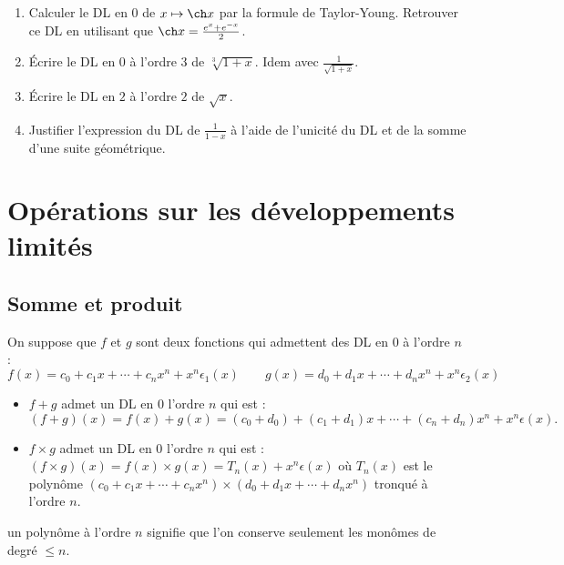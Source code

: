 \documentclass[class=report,crop=false]{standalone}
\begin{document}
\begin{miniexercices}
\sauteligne
\begin{enumerate}
  \item Calculer le DL en $0$ de $x\mapsto \ch x$ par la formule de Taylor-Young.
Retrouver ce DL en utilisant que $\ch x = \frac{e^x+e^{-x}}{2}$.
  \item Écrire le DL en $0$ à l'ordre $3$ de $\sqrt[3]{1+x}$. Idem avec $\frac{1}{\sqrt{1+x}}$.
  \item Écrire le DL en $2$ à l'ordre $2$ de $\sqrt{x}$.
  \item Justifier l'expression du DL de $\frac{1}{1-x}$ à l'aide de l'unicité du DL
et de la somme d'une suite géométrique.
\end{enumerate}
\end{miniexercices}



\section{Opérations sur les développements limités}

\subsection{Somme et produit}

On suppose que $f$ et $g$ sont deux fonctions qui admettent des DL en $0$ à l'ordre $n$ :
$$f(x)=c_0+c_1x + \cdots +c_nx^n + x^n\epsilon_1(x)\qquad
g(x)=d_0+d_1x + \cdots +d_nx^n + x^n\epsilon_2(x)$$

\begin{proposition}
\sauteligne
\begin{itemize}
  \item $f+g$  admet un DL en $0$ l'ordre $n$ qui est :
$$(f+g)(x)=f(x)+g(x)=(c_0+d_0)+(c_1+d_1)x+\cdots+(c_n+d_n)x^n +x^n\epsilon(x).$$

  \item $f\times g$ admet un DL en $0$ l'ordre $n$ qui est :
$(f \times g)(x)=f(x) \times g(x)= T_n(x)+x^n\epsilon (x)$
où $T_n(x)$ est le  polynôme
$(c_0+c_1x + \cdots +c_nx^n)\times(d_0+d_1x + \cdots +d_nx^n)$
tronqué à l'ordre $n$.
\end{itemize}
\end{proposition}

 un polynôme à l'ordre $n$ signifie que l'on conserve seulement
les monômes de degré $\le n$.
\end{document}
